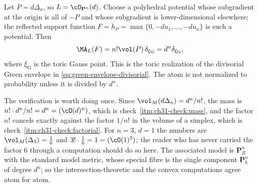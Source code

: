 \begin{example}
\label{ex:ch31-toric-atom-pn}
Let \(P=d\Delta_n\), so \(L=\cO_{\mathbf P^n}(d)\).  Choose a
polyhedral potential whose subgradient at the origin is all of \(-P\) and
whose subgradient is lower-dimensional elsewhere; the reflected support
function \(F=\check h_P=\max\{0,-du_1,\ldots,-du_n\}\) is such a potential.
Then
\[
             \MA_L(F)=n!\vol(P)\,\delta_{\xi_{\mathrm G}}
                      =d^n\delta_{\xi_{\mathrm G}},
\]
where \(\xi_{\mathrm G}\) is the toric Gauss point.  This is the toric
realization of the divisorial Green envelope in
\eqref{eq:green-envelope-divisorial}.  The atom is not normalized to
probability unless it is divided by \(d^n\).
\end{example}

The verification is worth doing once.  Since
\(\vol_M(d\Delta_n)=d^n/n!\), the mass is
\(n!\cdot d^n/n!=d^n=(\cO(d)^n)\), which is
check~\cref{itm:ch31-check:mass}, and the factor \(n!\) cancels exactly
against the factor \(1/n!\) in the volume of a simplex, which is
check~\cref{itm:ch31-check:factorial}.  For \(n=3\), \(d=1\) the numbers are
\(\vol_M(\Delta_3)=\tfrac16\) and \(3!\cdot\tfrac16=1=(\cO(1)^3)\); the
reader who has never carried the factor \(6\) through a computation should
do so here.  The associated model is \(\mathbf P^n_R\) with the standard
model metric, whose special fibre is the single component
\(\mathbf P^n_k\) of degree \(d^n\); so the intersection-theoretic and the
convex computations agree atom for atom.

